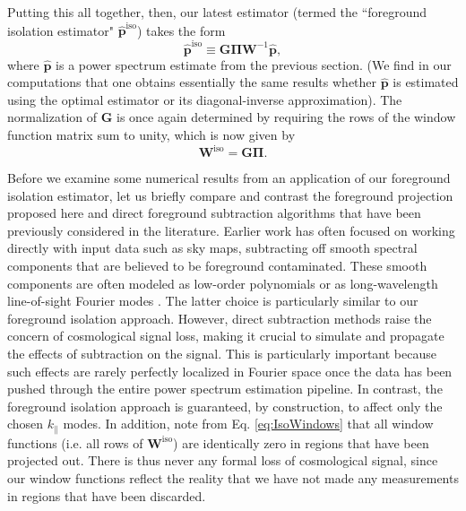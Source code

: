 \documentclass[twocolumn,aps,prd,nofootinbib,showpacs]{revtex4-1}
\begin{document}
Putting this all together, then, our latest estimator (termed the ``foreground isolation estimator" $\mathbf{\widehat{p}}^\textrm{iso}$) takes the form
\begin{equation}
\mathbf{\widehat{p}}^\textrm{iso} \equiv \mathbf{G} \boldsymbol \Pi \mathbf{W}^{-1} \mathbf{\widehat{p}},
\end{equation}
where $\mathbf{\widehat{p}}$ is a power spectrum estimate from the previous section.  (We find in our computations that one obtains essentially the same results whether $\mathbf{\widehat{p}}$ is estimated using the optimal estimator or its diagonal-inverse approximation).  The normalization of $\mathbf{G}$ is once again determined by requiring the rows of the window function matrix sum to unity, which is now given by
\begin{equation}
\label{eq:IsoWindows}
\mathbf{W}^\textrm{iso} = \mathbf{G} \boldsymbol \Pi.
\end{equation}

Before we examine some numerical results from an application of our foreground isolation estimator, let us briefly compare and contrast the foreground projection proposed here and direct foreground subtraction algorithms that have been previously considered in the literature.  Earlier work has often focused on working directly with input data such as sky maps, subtracting off smooth spectral components that are believed to be foreground contaminated.  These smooth components are often modeled as low-order polynomials \cite{Wang2006,Liu2009a,Bowman2009,Liu2009b} or as long-wavelength line-of-sight Fourier modes \cite{Petrovic2011}.  The latter choice is particularly similar to our foreground isolation approach.  However, direct subtraction methods raise the concern of cosmological signal loss, making it crucial to simulate and propagate the effects of subtraction on the signal.  This is particularly important because such effects are rarely perfectly localized in Fourier space once the data has been pushed through the entire power spectrum estimation pipeline.  In contrast, the foreground isolation approach is guaranteed, by construction, to affect only the chosen $k_\parallel$ modes.  In addition, note from Eq. \eqref{eq:IsoWindows} that all window functions (i.e. all rows of $\mathbf{W}^\textrm{iso}$) are identically zero in regions that have been projected out.  There is thus never any formal loss of cosmological signal, since our window functions reflect the reality that we have not made any measurements in regions that have been discarded.
\end{document}

